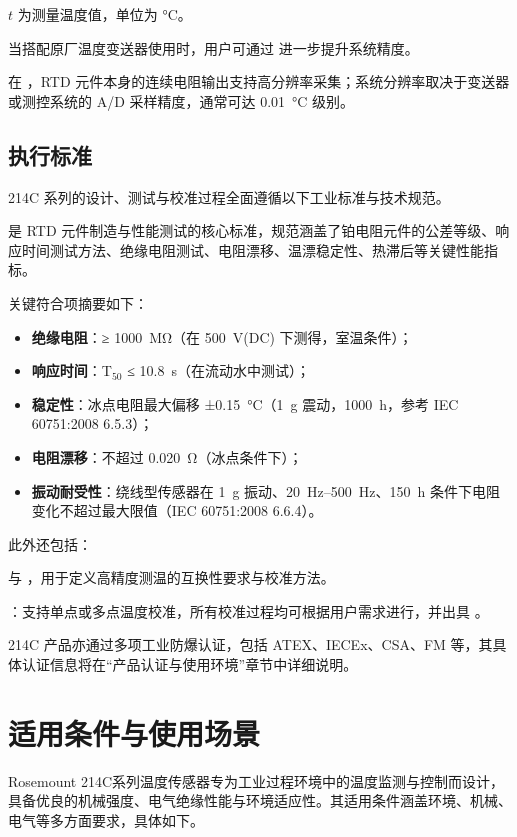  $t$ 为测量温度值，单位为 \si{\degreeCelsius}。

当搭配原厂温度变送器使用时，用户可通过  进一步提升系统精度。

在 ，RTD 元件本身的连续电阻输出支持高分辨率采集；系统分辨率取决于变送器或测控系统的 A/D 采样精度，通常可达 \SI{0.01}{\degreeCelsius} 级别。

\subsection{执行标准}

214C 系列的设计、测试与校准过程全面遵循以下工业标准与技术规范。

 是 RTD 元件制造与性能测试的核心标准，规范涵盖了铂电阻元件的公差等级、响应时间测试方法、绝缘电阻测试、电阻漂移、温漂稳定性、热滞后等关键性能指标。

关键符合项摘要如下：

\begin{itemize}
	\item \textbf{绝缘电阻}：≥ \SI{1000}{\mega\ohm}（在 \SI{500}{\volt}(DC) 下测得，室温条件）；
	\item \textbf{响应时间}：T$_{50}$ ≤ \SI{10.8}{\second}（在流动水中测试）；
	\item \textbf{稳定性}：冰点电阻最大偏移 ±\SI{0.15}{\degreeCelsius}（\SI{1}{\gram} 震动，\SI{1000}{\hour}，参考 IEC 60751:2008 6.5.3）；
	\item \textbf{电阻漂移}：不超过 \SI{0.020}{\ohm}（冰点条件下）；
	\item \textbf{振动耐受性}：绕线型传感器在 \SI{1}{\gram} 振动、\SIrange{20}{500}{\hertz}、\SI{150}{\hour} 条件下电阻变化不超过最大限值（IEC 60751:2008 6.6.4）。
\end{itemize}

此外还包括：

 与 ，用于定义高精度测温的互换性要求与校准方法。

：支持单点或多点温度校准，所有校准过程均可根据用户需求进行，并出具 。

214C 产品亦通过多项工业防爆认证，包括 ATEX、IECEx、CSA、FM 等，其具体认证信息将在“产品认证与使用环境”章节中详细说明。

\section{适用条件与使用场景}
Rosemount 214C系列温度传感器专为工业过程环境中的温度监测与控制而设计，具备优良的机械强度、电气绝缘性能与环境适应性。其适用条件涵盖环境、机械、电气等多方面要求，具体如下。


